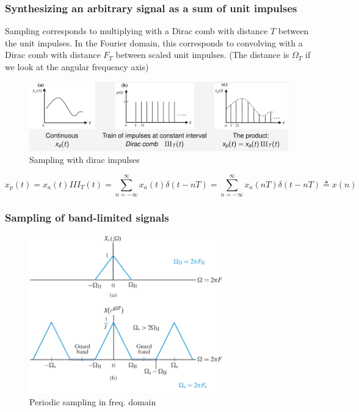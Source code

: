 \documentclass{article}
\begin{document}
\subsubsection{Synthesizing an arbitrary signal as a sum of unit impulses}

Sampling corresponds to multiplying with a Dirac comb with distance $T$ between the unit impulses.
In the Fourier domain, this corresponds to convolving with a Dirac comb with distance $F_T$ between
scaled unit impulses. (The distance is $\Omega_T$ if we look at the angular frequency axis)
\begin{figure}[h!]
    \centering
    \includegraphics[width=1\textwidth]{figures/Sampling and reconstruction/Sampling_dirac_impulses.png}
    \caption{Sampling with dirac impulses}
    \label{fig:sampling_dirac_impulses}
\end{figure}
\begin{equation}
    x_p (t) = x_a (t) III_T (t) = \sum_{n=-\infty}^{\infty} x_a (t) \delta (t - nT) = \sum_{n=-\infty}^{\infty} x_a (nT) \delta (t - nT) \triangleq x(n)
\end{equation}

\clearpage
\subsubsection{Sampling of band-limited signals}
\begin{figure}[h!]
    \centering
    \includegraphics[width=0.75\textwidth]{figures/Sampling and reconstruction/sampling_band_lim_signal.png}
    \caption{Periodic sampling in freq. domain}
    \label{fig:sampling_band_lim_signal}
\end{figure}
\end{document}
